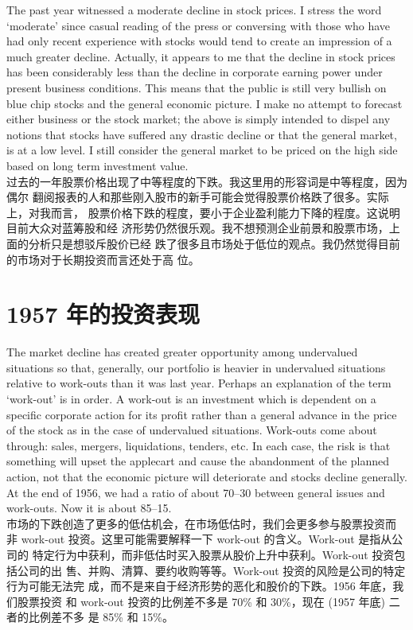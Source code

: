 \begin{verseparallel}
  {
    The past year witnessed a moderate decline in stock prices. I stress the
    word `moderate' since casual reading of the press or conversing with those
    who have had only recent experience with stocks would tend to create an
    impression of a much greater decline. Actually, it appears to me that the
    decline in stock prices has been considerably less than the decline in
    corporate earning power under present business conditions. This means that
    the public is still very bullish on blue chip stocks and the general
    economic picture. I make no attempt to forecast either business or the stock
    market; the above is simply intended to dispel any notions that stocks have
    suffered any drastic decline or that the general market, is at a low level.
    I still consider the general market to be priced on the high side based on
    long term investment value. \\
  }
  {
    过去的一年股票价格出现了中等程度的下跌。我这里用的形容词是中等程度，因为偶尔
    翻阅报表的人和那些刚入股市的新手可能会觉得股票价格跌了很多。实际上，对我而言，
    股票价格下跌的程度，要小于企业盈利能力下降的程度。这说明目前大众对蓝筹股和经
    济形势仍然很乐观。我不想预测企业前景和股票市场，上面的分析只是想驳斥股价已经
    跌了很多且市场处于低位的观点。我仍然觉得目前的市场对于长期投资而言还处于高
    位。
  }
\end{verseparallel}

\section{1957 年的投资表现}

\begin{verseparallel}
  {
    The market decline has created greater opportunity among undervalued
    situations so that, generally, our portfolio is heavier in undervalued
    situations relative to work-outs than it was last year. Perhaps an
    explanation of the term `work-out' is in order. A work-out is an investment
    which is dependent on a specific corporate action for its profit rather than
    a general advance in the price of the stock as in the case of undervalued
    situations. Work-outs come about through: sales, mergers, liquidations,
    tenders, etc. In each case, the risk is that something will upset the
    applecart and cause the abandonment of the planned action, not that the
    economic picture will deteriorate and stocks decline generally. At the end
    of 1956, we had a ratio of about 70--30 between general issues and work-outs.
    Now it is about 85--15. \\
  }
  {
    市场的下跌创造了更多的低估机会，在市场低估时，我们会更多参与股票投资而
    非 work-out 投资。这里可能需要解释一下 work-out 的含义。Work-out 是指从公司的
    特定行为中获利，而非低估时买入股票从股价上升中获利。Work-out 投资包括公司的出
    售、并购、清算、要约收购等等。Work-out 投资的风险是公司的特定行为可能无法完
    成，而不是来自于经济形势的恶化和股价的下跌。1956 年底，我们股票投资
    和 work-out 投资的比例差不多是 70\% 和 30\%，现在 (1957 年底) 二者的比例差不多
    是 85\% 和 15\%。
  }
\end{verseparallel}


